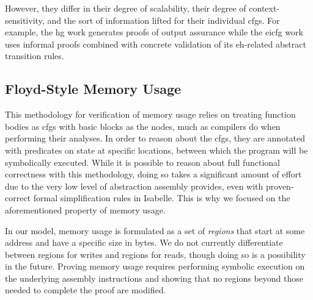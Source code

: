 However, they differ in their degree of scalability, their degree of context-sensitivity, and the sort of information lifted for their individual \acp{cfg}.
For example, the \ac{hg} work generates proofs of output assurance while the \ac{eicfg} work uses informal proofs combined with concrete validation of its \ac{eh}-related abstract transition rules.

\begin{comment}
  For example, we have shown that we can formally verify approximately \num{12000} lines of assembly code obtained by disassembling binaries of the Xen hypervisor \autocite{xen} with minimal user interaction.

  To fill the latter gap, we provide binary-level approaches to dealing with complex, interprocedural control flow in the presence of indirect branches and even exceptions.
  First, a more general \emph{\ac{hg}} approach, followed by one focused specifically on \emph{exceptional control flow}, \emph{\acp{eicfg}}.
  We have found no other approaches that lift binaries to \ac{eicfg}-like constructs.
\end{comment}

\subsection{Floyd-Style Memory Usage}
This methodology for verification of memory usage relies on treating function bodies as \acp{cfg} with basic blocks as the nodes, much as compilers do when performing their analyses.
In order to reason about the \acp{cfg}, they are annotated with predicates on state at specific locations, between which the program will be symbolically executed.
While it is possible to reason about full functional correctness with this methodology, doing so takes a significant amount of effort due to the very low level of abstraction assembly provides, even with proven-correct formal simplification rules in Isabelle.
This is why we focused on the aforementioned property of memory usage.

In our model, memory usage is formulated as a set of \emph{regions} that start at some address and have a specific size in bytes.
We do not currently differentiate between regions for writes and regions for reads, though doing so is a possibility in the future.
Proving memory usage requires performing symbolic execution on the underlying assembly instructions and showing that no regions beyond those needed to complete the proof are modified.

